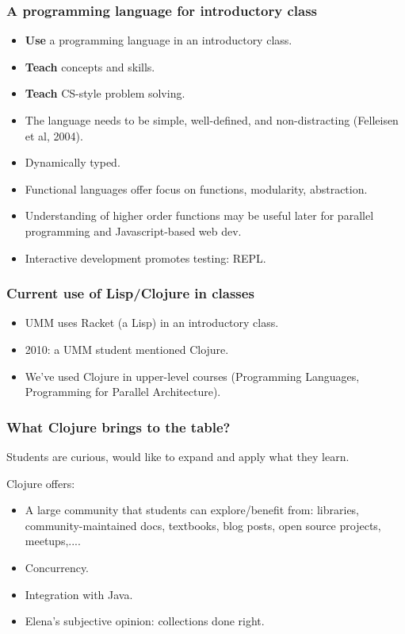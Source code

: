\documentclass{beamer}
\begin{document}
\begin{frame}
   \frametitle{A programming language for introductory class}
\begin{itemize}
\item {\bf Use} a programming language in an introductory class.
\item <2->{\bf  Teach} concepts and skills.
\item <3-> {\bf  Teach} CS-style problem solving.
\item <4->The language needs to be simple, well-defined, and non-distracting (Felleisen et al, 2004).
\item <5->Dynamically typed.
\item <6-> Functional languages offer focus on functions, modularity, abstraction.
\item <7-> Understanding of higher order functions may be useful later for parallel programming and Javascript-based web dev. 
\item <8-> Interactive development promotes testing: REPL. 
\end{itemize}
\end{frame}

\begin{frame}
   \frametitle{Current use of Lisp/Clojure in classes}
\begin{itemize}
\item UMM uses Racket (a Lisp) in an introductory class. 
\item 2010: a UMM student mentioned Clojure. 
\item We've used Clojure in upper-level courses (Programming Languages, Programming for Parallel Architecture).
\end{itemize}
\end{frame}

\begin{frame}
   \frametitle{What Clojure brings to the table?}
Students are curious, would like to expand and apply what they learn. 

Clojure offers:
\begin{itemize}
\item A large community that students can explore/benefit from: libraries, community-maintained docs, textbooks, blog posts, open source projects, meetups,....
\item Concurrency.
\item Integration with Java. 
\item Elena's subjective opinion: collections done right. 
\end{itemize}
\end{frame}
\end{document}
